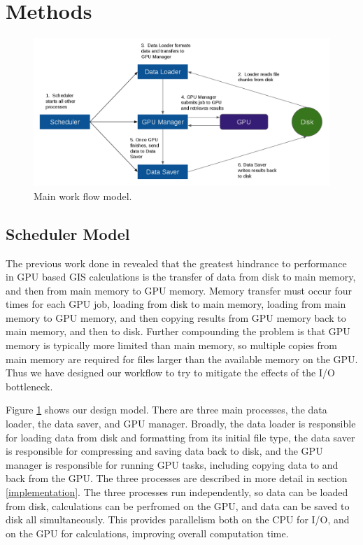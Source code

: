\documentclass[journal]{IEEEtran}
\begin{document}
\section{Methods} \label{methods}
    \begin{figure}
        \includegraphics[width=\linewidth]{model.png}
        \caption{Main work flow model.}
        \label{model}
    \end{figure}
    \subsection{Scheduler Model}
    The previous work done in \cite{hpc_cuda} revealed that the greatest
    hindrance to performance in GPU based GIS calculations is the transfer of
    data from disk to main memory, and then from main memory to GPU memory.
    Memory transfer must occur four times for each GPU job, loading from disk
    to main memory, loading from main memory to GPU memory, and then copying
    results from GPU memory back to main memory, and then to disk.  Further
    compounding the problem is that GPU memory is typically more limited than
    main memory, so multiple copies from main memory are required for files
    larger than the available memory on the GPU. Thus we have designed our
    workflow to try to mitigate the effects of the I/O bottleneck.

    Figure \ref{model} shows our design model. There are three main processes,
    the data loader, the data saver, and GPU manager. Broadly, the data loader
    is responsible for loading data from disk and formatting from its initial
    file type, the data saver is responsible for compressing and saving data
    back to disk, and the GPU manager is responsible for running GPU tasks,
    including copying data to and back from the GPU. The three processes are
    described in more detail in section \ref{implementation}. The three
    processes run independently, so data can be loaded from disk, calculations
    can be perfromed on the GPU, and data can be saved to disk all
    simultaneously.  This provides parallelism both on the CPU for I/O, and on
    the GPU for calculations, improving overall computation time.
    
\end{document}
